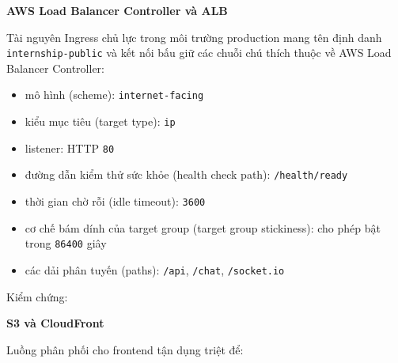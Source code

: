 \vspace{0.5em}\noindent\textbf{AWS Load Balancer Controller và
ALB}\par

Tài nguyên Ingress chủ lực trong môi trường production mang tên định
danh \texttt{internship-\allowbreak{}public} và kết nối bấu giữ các chuỗi chú thích
thuộc về AWS Load Balancer Controller:

\begin{itemize}
\tightlist
\item
  mô hình (scheme): \texttt{internet-\allowbreak{}facing}
\item
  kiểu mục tiêu (target type): \texttt{ip}
\item
  listener: HTTP \texttt{80}
\item
  đường dẫn kiểm thử sức khỏe (health check path):
  \texttt{/\allowbreak{}health/\allowbreak{}ready}
\item
  thời gian chờ rỗi (idle timeout): \texttt{3600}
\item
  cơ chế bám dính của target group (target group stickiness): cho phép
  bật trong \texttt{86400} giây
\item
  các dải phân tuyến (paths): \texttt{/\allowbreak{}api}, \texttt{/\allowbreak{}chat},
  \texttt{/\allowbreak{}socket.\allowbreak{}io}
\end{itemize}

Kiểm chứng:

\begin{Shaded}
\begin{Highlighting}[]
\end{Highlighting}
\end{Shaded}

\vspace{0.5em}\noindent\textbf{S3 và CloudFront}\par

Luồng phân phối cho frontend tận dụng triệt để:

